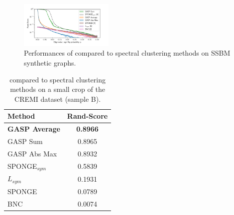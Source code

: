 \begin{figure}
\centering
        \includegraphics[width=0.4\textwidth,trim=0.25in 0.25in 0.68in 0.36in,clip]{./figs/SSBM_experiments.pdf} %
        \caption{Performances of \algname{} compared to spectral clustering methods on SSBM synthetic graphs.}
    \label{fig:SSBM_spectral_experiments}
\end{figure}
\begin{table}
\centering
\footnotesize
\begin{tabular}{l|c}
           Method & Rand-Score \\ \midrule
           \textbf{GASP Average} & \textbf{0.8966} \\
GASP Sum & 0.8965 \\
GASP Abs Max & 0.8932 \\
SPONGE$_{sym}$ \cite{Cucuringu2019SPONGEAG} & 0.5839\\
$L_{sym}$ \cite{kunegis2010spectral} & 0.1931 \\
SPONGE \cite{Cucuringu2019SPONGEAG} & 0.0789 \\
BNC \cite{chiang2012scalable} & 0.0074 \\
        \end{tabular}
    \caption{\algname{} compared to spectral clustering methods on a small crop of the CREMI dataset (sample B).}
    \label{tab:cremi_spectral_experiments}
\end{table}
